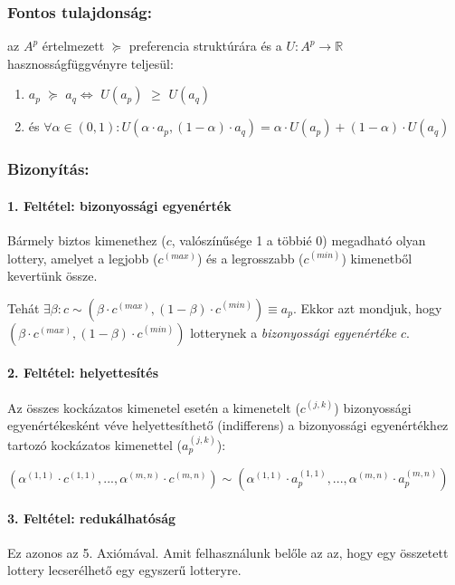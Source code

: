 \documentclass[a4paper,12pt]{article}
\begin{document}
\subsubsection{Fontos tulajdonság: } az $A^p$ értelmezett $\succeq$ preferencia struktúrára és a $U: A^p \rightarrow \mathbb{R}$ hasznosságfüggvényre teljesül: 
\begin{enumerate}
\item $a_p$  $\succeq$ $a_q \Leftrightarrow $ $U(a_p)$  $\geq$ $U(a_q)$
\item és $\forall  \alpha \in (0,1): U(\alpha\cdot a_p , (1-\alpha)\cdot a_q ) = \alpha\cdot U(a_p) + (1-\alpha)\cdot U(a_q) $
\end{enumerate}

\subsubsection{Bizonyítás: }
 
\paragraph{1. Feltétel: bizonyossági egyenérték}
Bármely biztos kimenethez ($c$, valószínűsége 1 a többié 0) megadható olyan lottery, amelyet a legjobb ($c^{(max)}$) és a legrosszabb ($c^{(min)}$) kimenetből kevertünk össze. 

Tehát $\exists \beta: c \sim (\beta\cdot c^{(max)}, (1-\beta)\cdot c^{(min)}) \equiv a_p$. Ekkor azt mondjuk, hogy $(\beta\cdot c^{(max)}, (1-\beta)\cdot c^{(min)})$ lotterynek a \emph{bizonyossági egyenértéke} $c$.

\paragraph{2. Feltétel: helyettesítés}

Az összes kockázatos kimenetel esetén a kimenetelt ($c^{(j,k)}$) bizonyossági egyenértékesként véve helyettesíthető (indifferens) a bizonyossági egyenértékhez tartozó kockázatos kimenettel ($a^{(j,k)}_p$):

$(\alpha^{(1,1)}\cdot c^{(1,1)},...,\alpha^{(m,n)}\cdot c^{(m,n)}) \sim (\alpha^{(1,1)}\cdot a^{(1,1)}_p,...,\alpha^{(m,n)}\cdot a^{(m,n)}_p) $


\paragraph{3. Feltétel: redukálhatóság}

Ez azonos az 5. Axiómával. Amit felhasználunk belőle az az, hogy egy összetett lottery lecserélhető egy egyszerű lotteryre.
\end{document}
